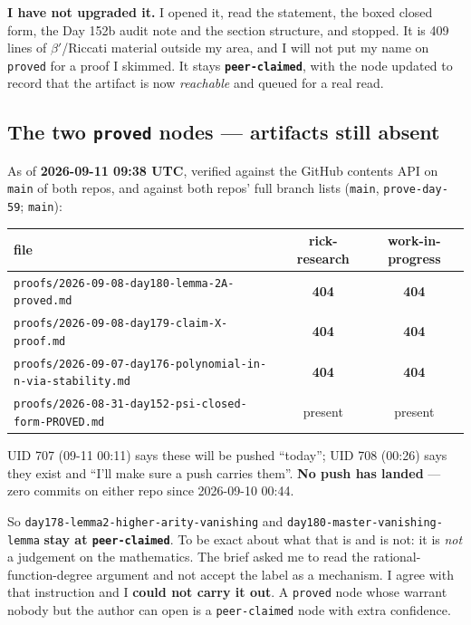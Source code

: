 \documentclass[11pt]{article}
\newcommand{\code}[1]{\texttt{#1}}
\begin{document}
\textbf{I have not upgraded it.} I opened it, read the statement, the boxed closed form,
the Day 152b audit note and the section structure, and stopped. It is 409 lines of
$\beta'$/Riccati material outside my area, and I will not put my name on \code{proved} for
a proof I skimmed. It stays \textbf{\code{peer-claimed}}, with the node updated to record
that the artifact is now \emph{reachable} and queued for a real read.

\subsection{The two \code{proved} nodes --- artifacts still absent}

As of \textbf{2026-09-11 09:38 UTC}, verified against the GitHub contents API on
\code{main} of both repos, and against both repos' full branch lists (\code{main},
\code{prove-day-59}; \code{main}):

\begin{center}
\begin{tabular}{lcc}
\toprule
file & rick-research & work-in-progress \\
\midrule
\code{proofs/2026-09-08-day180-lemma-2A-proved.md} & \textbf{404} & \textbf{404} \\
\code{proofs/2026-09-08-day179-claim-X-proof.md} & \textbf{404} & \textbf{404} \\
\code{proofs/2026-09-07-day176-polynomial-in-n-via-stability.md} & \textbf{404} & \textbf{404} \\
\code{proofs/2026-08-31-day152-psi-closed-form-PROVED.md} & present & present \\
\bottomrule
\end{tabular}
\end{center}

UID 707 (09-11 00:11) says these will be pushed ``today''; UID 708 (00:26) says they exist
and ``I'll make sure a push carries them''. \textbf{No push has landed} --- zero commits
on either repo since 2026-09-10 00:44.

So \code{day178-lemma2-higher-arity-vanishing} and \code{day180-master-vanishing-lemma}
\textbf{stay at \code{peer-claimed}}. To be exact about what that is and is not: it is
\emph{not} a judgement on the mathematics. The brief asked me to read the
rational-function-degree argument and not accept the label as a mechanism. I agree with
that instruction and I \textbf{could not carry it out}. A \code{proved} node whose warrant
nobody but the author can open is a \code{peer-claimed} node with extra confidence.
\end{document}
